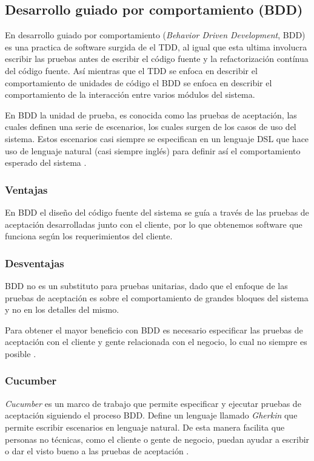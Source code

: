 \subsection{Desarrollo guiado por comportamiento (BDD)}
En desarrollo guiado por comportamiento (\textit{Behavior Driven Development}, BDD)
es una practica de software surgida de el TDD, al igual que esta ultima
involucra escribir las pruebas antes de escribir el código fuente y la
refactorización contínua del código fuente. Así mientras que el TDD se enfoca
en describir el comportamiento de unidades de código el BDD se enfoca en
describir el comportamiento de la interacción entre varios módulos del sistema.

En BDD la unidad de prueba, es conocida como las pruebas de aceptación, las cuales
definen una serie de escenarios, los cuales surgen de los casos de uso del sistema.
Estos escenarios casi siempre se especifican en un lenguaje DSL que hace uso
de lenguaje natural (casi siempre inglés) para definir así el comportamiento
esperado del sistema \cite{23_chelimsky_2010}.

\subsubsection{Ventajas}
En BDD el diseño del código fuente del sistema se guía a través de las pruebas
de aceptación desarrolladas junto con el cliente, por lo que obtenemos software
que funciona según los requerimientos del cliente.

\subsubsection{Desventajas}
BDD no es un substituto para pruebas unitarias, dado que el enfoque de
las pruebas de aceptación es sobre el comportamiento de grandes bloques
del sistema y no en los detalles del mismo.

Para obtener el mayor beneficio con BDD es necesario especificar las pruebas
de aceptación con el cliente y gente relacionada con el negocio, lo cual no
siempre es posible \cite{12_rappin_2010}.

\subsubsection{Cucumber}
\textit{Cucumber} es un marco de trabajo que permite especificar y ejecutar
pruebas de aceptación siguiendo el proceso BDD. Define un lenguaje llamado
\textit{Gherkin} que permite escribir escenarios en lenguaje natural. De esta manera
facilita que personas no técnicas, como el cliente o gente de negocio,
puedan ayudar a escribir o dar el visto bueno a las pruebas de aceptación
\cite{23_chelimsky_2010}.

